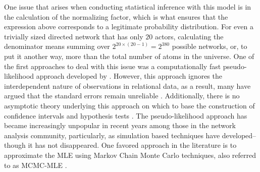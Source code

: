 \documentclass[11pt,pdflatex]{elsarticle}
\newcommand{\pkg}[1]{{\fontseries{b}\selectfont #1}}
\begin{document}
One issue that arises when conducting statistical inference with this model is in the calculation of the normalizing factor, which is what ensures that the expression above corresponds to a legitimate probability distribution. For even a trivially sized directed network that has only $20$ actors, calculating the denominator means summing over $2^{20\times(20-1)} = 2^{380}$ possible networks, or, to put it another way, more than the total number of atoms in the universe. One of the first approaches to deal with this issue was a computationally fast pseudo-likelihood approach developed by \citet{strauss:ikeda:1990}. However, this approach ignores the interdependent nature of observations in relational data, as a result, many have argued that the standard errors remain unreliable \citep{vanduijn:etal:2009}. Additionally, there is no asymptotic theory underlying this approach on which to base the construction of confidence intervals and hypothesis tests \citep{kolaczyk:2009}.
The pseudo-likelihood approach has became increasingly unpopular in recent years among those in the network analysis community, particularly, as simulation based techniques have developed--though it has not disappeared. One favored approach in the literature is to approximate the MLE using Markov Chain Monte Carlo techniques, also referred to as MCMC-MLE \citep{geyer:thompson:1992,snijders:2002,handcock:2003a}.
\end{document}
